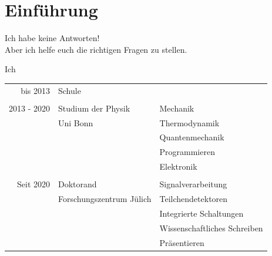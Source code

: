 \section{Einführung}
\begin{frame}{}
\begin{center}
    {\Huge Ich habe keine Antworten!}\\
    Aber ich helfe euch die richtigen Fragen zu stellen.

\end{center}
\end{frame}

\begin{frame}{Ich}
    \begin{table}
        \begin{tabularx}{\textwidth}{rll}
            bis 2013 & Schule & \\            
            & & \\
            2013 - 2020 & Studium der Physik & Mechanik\\
            & Uni Bonn & Thermodynamik\\
            & & Quantenmechanik\\
            & & Programmieren\\
            & & Elektronik\\
            & & \\
            Seit 2020 & Doktorand & Signalverarbeitung\\
            & Forschungszentrum Jülich & Teilchendetektoren\\
            & & Integrierte Schaltungen\\  
            & & Wissenschaftliches Schreiben \\
            & & Präsentieren \\
        \end{tabularx}
    \end{table}
\end{frame}


